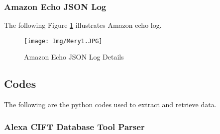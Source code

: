 \documentclass{easychair}
\begin{document}
\subsubsection{Amazon Echo JSON Log}
The following Figure \ref{fig:Amazon Echo JSON Log Details} illustrates Amazon echo log.
\begin{figure}[h]
    \centering
    \texttt{[image: Img/Mery1.JPG]}
    \caption{Amazon Echo JSON Log Details}
    \label{fig:Amazon Echo JSON Log Details}
\end{figure}
\newpage




\subsection{Codes}
The following are the python codes used to extract and retrieve data.
\subsubsection{Alexa CIFT Database Tool Parser}
\end{document}

